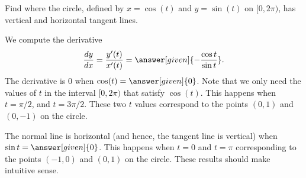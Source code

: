 \documentclass{ximera}
\begin{document}
\begin{example}
  Find where the circle, defined by $x=\cos( t)$ and $y=\sin( t)$ on
  $[0,2\pi)$, has vertical and horizontal tangent lines.
  \begin{explanation}
    We compute the derivative 
    \[
    \dd[y]{x} = \frac{y'(t)}{x'(t)} = \answer[given]{-\frac{\cos t}{\sin t}}.
    \]
    The derivative is $0$ when $\cos( t)= \answer[given]{0}$. Note that we only need the values of $t$ in the interval $[0, 2\pi)$ that satisfy $\cos(t)$. 
    This  happens when $t=\pi/2$, and $t= 3\pi/2$. These two $t$ values correspond to the points $(0,1)$ and $(0,-1)$ on the circle.

    The normal line is horizontal (and hence, the tangent line is
    vertical) when $\sin t=\answer[given]{0}$. This happens when $t=
    0$ and $t=\pi$ corresponding to the points $(-1,0)$ and
    $(0,1)$ on the circle. These results should make intuitive sense.
  \end{explanation}





\end{example}
\end{document}
